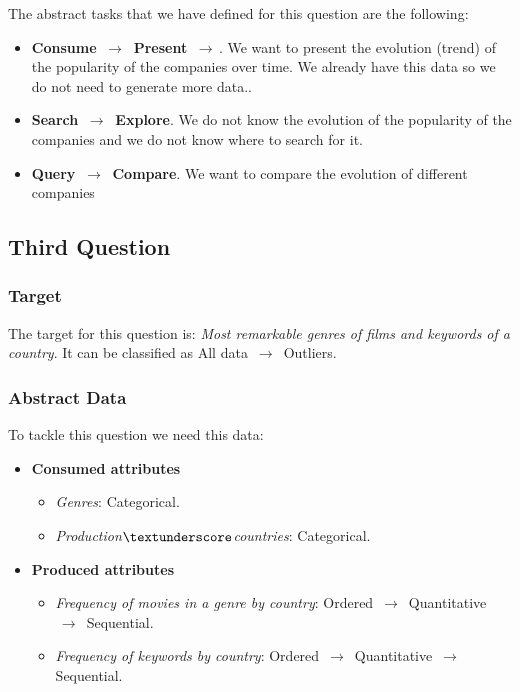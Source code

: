 The abstract tasks that we have defined for this question are the following:

\begin{itemize}
	\item \textbf{Consume $\,\to\,$ Present $\,\to\,$}. We want to present the evolution (trend) of the popularity of the companies over time. We already have this data so we do not need to generate more data..
	\item \textbf{Search $\,\to\,$ Explore}. We do not know the evolution of the popularity of the companies and we do not know where to search for it.
	\item \textbf{Query $\,\to\,$ Compare}. We want to compare the evolution of different companies
\end{itemize}

\subsection{Third Question}

\subsubsection{Target}
The target for this question is: \textit{Most remarkable genres of films and keywords of a country}. It can be classified as All data $\,\to\,$ Outliers.

\subsubsection{Abstract Data}

To tackle this question we need this data:

\begin{itemize}
	\item \textbf{Consumed attributes}
		\begin{itemize}
			\item \textit{Genres}: Categorical.
			\item \textit{Production$\textunderscore$countries}: Categorical.
		\end{itemize}
	\item \textbf{Produced attributes}
		\begin{itemize}
			\item \textit{Frequency of movies in a genre by country}: Ordered $\,\to\,$ Quantitative $\,\to\,$ Sequential.
			\item \textit{Frequency of keywords by country}: Ordered $\,\to\,$ Quantitative $\,\to\,$ Sequential.
		\end{itemize}
\end{itemize}

